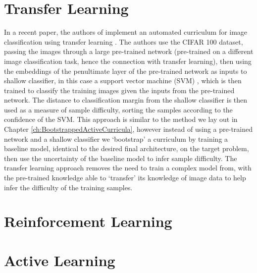 \section{Transfer Learning}
In a recent paper, the authors of \cite{weinshall2018curriculum} implement an automated curriculum for image classification using transfer learning \cite{pan2010survey}. The authors use the CIFAR 100 \cite{krizhevsky2009learning} dataset, passing the images through a large pre-trained network (pre-trained on a different image classification task, hence the connection with transfer learning), then using the embeddings of the penultimate layer of the pre-trained network as inputs to shallow classifier, in this case a support vector machine (SVM) \cite{hearst1998support}, which is then trained to classify the training images given the inputs from the pre-trained network. The distance to classification margin from the shallow classifier is then used as a measure of sample difficulty, sorting the samples according to the confidence of the SVM. This approach is similar to the method we lay out in Chapter \ref{ch:BootstrappedActiveCurricula}, however instead of using a pre-trained network and a shallow classifier we `bootstrap' a curriculum by training a baseline model, identical to the desired final architecture, on the target problem, then use the uncertainty of the baseline model to infer sample difficulty. The transfer learning approach removes the need to train a complex model from, with the pre-trained knowledge able to `transfer' its knowledge of image data to help infer the difficulty of the training samples. 

\section{Reinforcement Learning}

\section{Active Learning}